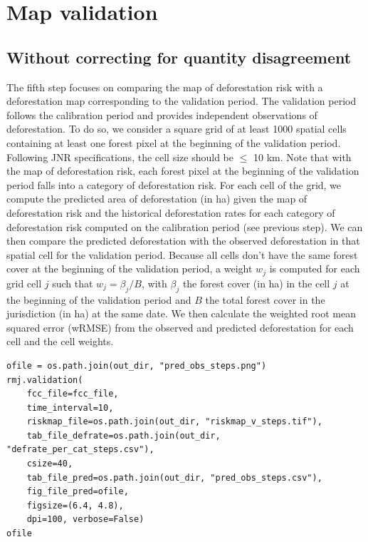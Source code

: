 \documentclass[paper=a4, 12pt, DIV=12]{scrartcl}
\begin{document}
\section{Map validation}
\label{sec:org175769b}

\subsection{Without correcting for quantity disagreement}
\label{sec:orgac806b8}

The fifth step focuses on comparing the map of deforestation risk with a deforestation map corresponding to the validation period. The validation period follows the calibration period and provides independent observations of deforestation. To do so, we consider a square grid of at least 1000 spatial cells containing at least one forest pixel at the beginning of the validation period. Following JNR specifications, the cell size should be \(\leq\) 10 km. Note that with the map of deforestation risk, each forest pixel at the beginning of the validation period falls into a category of deforestation risk. For each cell of the grid, we compute the predicted area of deforestation (in ha) given the map of deforestation risk and the historical deforestation rates for each category of deforestation risk computed on the calibration period (see previous step). We can then compare the predicted deforestation with the observed deforestation in that spatial cell for the validation period. Because all cells don't have the same forest cover at the beginning of the validation period, a weight \(w_j\) is computed for each grid cell \(j\) such that \(w_j=\beta_j / B\), with \(\beta_j\) the forest cover (in ha) in the cell \(j\) at the beginning of the validation period and \(B\) the total forest cover in the jurisdiction (in ha) at the same date. We then calculate the weighted root mean squared error (wRMSE) from the observed and predicted deforestation for each cell and the cell weights.

\begin{verbatim}
ofile = os.path.join(out_dir, "pred_obs_steps.png")
rmj.validation(
    fcc_file=fcc_file,
    time_interval=10,
    riskmap_file=os.path.join(out_dir, "riskmap_v_steps.tif"),
    tab_file_defrate=os.path.join(out_dir, "defrate_per_cat_steps.csv"),
    csize=40,
    tab_file_pred=os.path.join(out_dir, "pred_obs_steps.csv"),
    fig_file_pred=ofile,
    figsize=(6.4, 4.8),
    dpi=100, verbose=False)
ofile
\end{verbatim}
\end{document}

